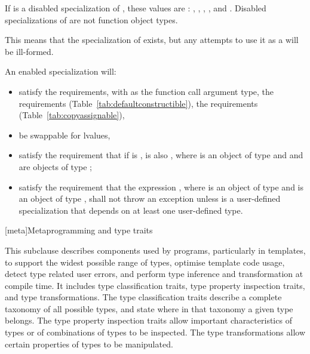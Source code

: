 \pnum
If  is a disabled specialization of ,
these values are :
,
,
,
, and
.
Disabled specializations of 
are not function object types.
\begin{note}
This means that the specialization of  exists, but
any attempts to use it as a  will be ill-formed.
\end{note}

\pnum
An enabled specialization  will:
\begin{itemize}
\item satisfy the  requirements,
with  as the function
call argument type, the  requirements (Table~\ref{tab:defaultconstructible}),
the  requirements (Table~\ref{tab:copyassignable}),
\item be swappable for lvalues,
\item satisfy the requirement that if  is ,  is
also , where  is an object of type  and  and 
are objects of type ;
\item satisfy the requirement that the expression , where 
is an object of type  and  is an object of type
, shall not throw an exception unless  is a
user-defined specialization that depends on at least one user-defined type.
\end{itemize}

[meta]{Metaprogramming and type traits}

\pnum
This subclause describes components used by \Cpp{} programs, particularly in
templates, to support the widest possible range of types, optimise
template code usage, detect type related user errors, and perform
type inference and transformation at compile time. It includes type
classification traits, type property inspection traits, and type
transformations. The type classification traits describe a complete taxonomy
of all possible \Cpp{} types, and state where in that taxonomy a given
type belongs. The type property inspection traits allow important
characteristics of types or of combinations of types to be inspected. The
type transformations allow certain properties of types to be manipulated.

